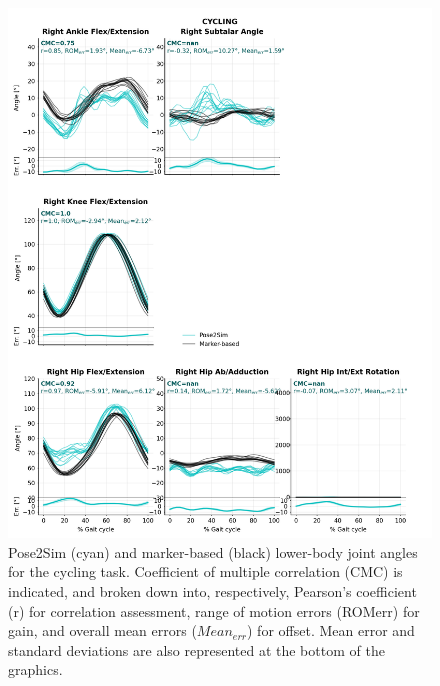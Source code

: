 \begin{figure}[!ht]
	\centering
	\def\svgwidth{1\columnwidth}
	\fontsize{10pt}{10pt}\selectfont
	\includegraphics[height=\dimexpr\textheight-119pt]{"../Annexes/Figures/Fig_QTMBike.png"}
	\caption{Pose2Sim (cyan) and marker-based (black) lower-body joint angles for the cycling task. Coefficient of multiple correlation (CMC) is indicated, and broken down into, respectively, Pearson’s coefficient (r) for correlation assessment, range of motion errors (ROMerr) for gain, and overall mean errors (\(Mean_{err}\)) for offset. Mean error and standard deviations are also represented at the bottom of the graphics.}
	\label{fig_qtmbike}
\end{figure}

